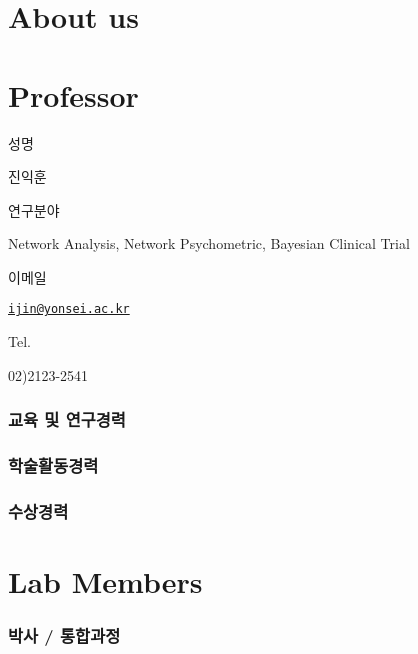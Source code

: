 \documentclass[
]{book}
\author{}
\date{\vspace{-2.5em}}
\begin{document}
{
\setcounter{tocdepth}{1}
\tableofcontents
}
\hypertarget{about-us}{%
\chapter*{About us}\label{about-us}}

\hypertarget{professor}{%
\chapter*{Professor}\label{professor}}

성명

진익훈

연구분야

Network Analysis, Network Psychometric, Bayesian Clinical Trial

이메일

\href{mailto:ijin@yonsei.ac.kr}{\nolinkurl{ijin@yonsei.ac.kr}}

Tel.

02)2123-2541

\hypertarget{uxad50uxc721-uxbc0f-uxc5f0uxad6cuxacbduxb825}{%
\subsection*{교육 및 연구경력}\label{uxad50uxc721-uxbc0f-uxc5f0uxad6cuxacbduxb825}}

\hypertarget{uxd559uxc220uxd65cuxb3d9uxacbduxb825}{%
\subsection*{학술활동경력}\label{uxd559uxc220uxd65cuxb3d9uxacbduxb825}}

\hypertarget{uxc218uxc0c1uxacbduxb825}{%
\subsection*{수상경력}\label{uxc218uxc0c1uxacbduxb825}}

\hypertarget{lab-members}{%
\chapter*{Lab Members}\label{lab-members}}

\hypertarget{uxbc15uxc0ac-uxd1b5uxd569uxacfcuxc815}{%
\subsection*{박사 / 통합과정}\label{uxbc15uxc0ac-uxd1b5uxd569uxacfcuxc815}}
\end{document}
